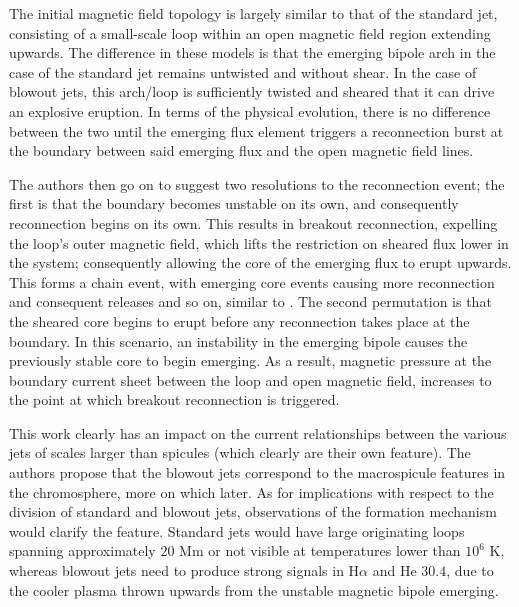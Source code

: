 The initial magnetic field topology is largely similar to that of the standard jet, consisting of a small-scale loop within an open magnetic field region extending upwards.
The difference in these models is that the emerging bipole arch in the case of the standard jet remains untwisted and without shear.
In the case of blowout jets, this arch/loop is sufficiently twisted and sheared that it can drive an explosive eruption.
In terms of the physical evolution, there is no difference between the two until the emerging flux element triggers a reconnection burst at the boundary between said emerging flux and the open magnetic field lines.

The authors then go on to suggest two resolutions to the reconnection event; the first is that the boundary becomes unstable on its own, and consequently reconnection begins on its own.
This results in breakout reconnection, expelling the loop's outer magnetic field, which lifts the restriction on sheared flux lower in the system; consequently allowing the core of the emerging flux to erupt upwards.
This forms a chain event, with emerging core events causing more reconnection and consequent releases and so on, similar to \cite{Antiochos1998}.
The second permutation is that the sheared core begins to erupt before any reconnection takes place at the boundary.
In this scenario, an instability in the emerging bipole causes the previously stable core to begin emerging.
As a result, magnetic pressure at the boundary current sheet between the loop and open magnetic field, increases to the point at which breakout reconnection is triggered.

This work clearly has an impact on the current relationships between the various jets of scales larger than spicules (which clearly are their own feature).
The authors propose that the blowout jets correspond to the macrospicule features in the chromosphere, more on which later.
As for implications with respect to the division of standard and blowout jets, observations of the formation mechanism would clarify the feature.
Standard jets would have large originating loops spanning approximately $20$ Mm or not visible at temperatures lower than $10^6$ K, whereas blowout jets need to produce strong signals in H$\alpha$ and He $30.4$, due to the cooler plasma thrown upwards from the unstable magnetic bipole emerging.







